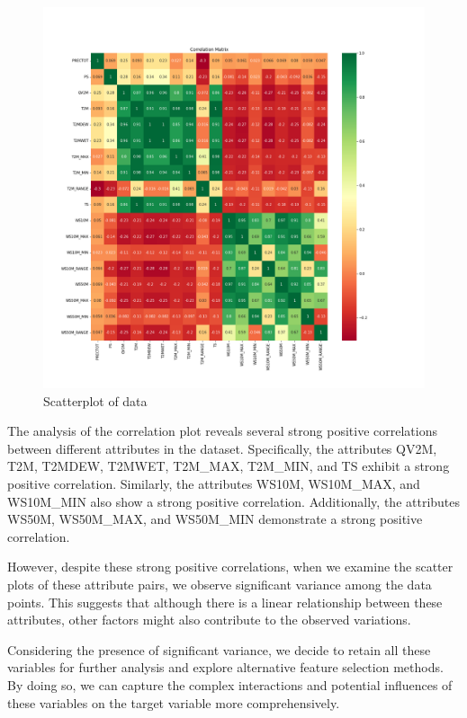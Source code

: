 \documentclass{article}
\begin{document}
\begin{figure}[htbp]
\centering
\includegraphics[width=\linewidth]{pic/correlation_plot.png}
\caption{Scatterplot of data}
\label{fig: Scatterplot of Data}
\end{figure}

\FloatBarrier


The analysis of the correlation plot reveals several strong positive correlations between different attributes in the dataset. Specifically, the attributes QV2M, T2M, T2MDEW, T2MWET, T2M\_MAX, T2M\_MIN, and TS exhibit a strong positive correlation. Similarly, the attributes WS10M, WS10M\_MAX, and WS10M\_MIN also show a strong positive correlation. Additionally, the attributes WS50M, WS50M\_MAX, and WS50M\_MIN demonstrate a strong positive correlation.

However, despite these strong positive correlations, when we examine the scatter plots of these attribute pairs, we observe significant variance among the data points. This suggests that although there is a linear relationship between these attributes, other factors might also contribute to the observed variations.

Considering the presence of significant variance, we decide to retain all these variables for further analysis and explore alternative feature selection methods. By doing so, we can capture the complex interactions and potential influences of these variables on the target variable more comprehensively.
\end{document}

